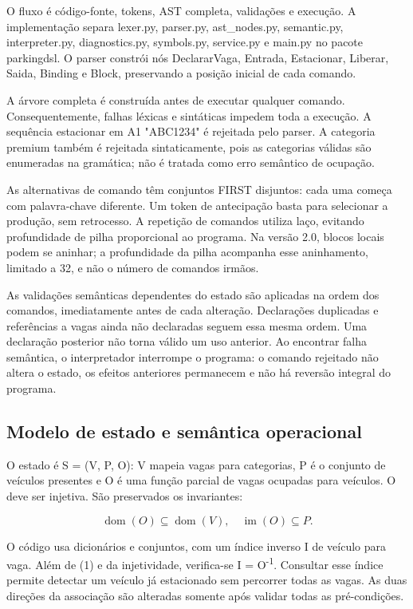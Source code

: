 \documentclass[conference,a4paper]{IEEEtran}
\begin{document}
O fluxo é código-fonte, tokens, AST completa, validações e execução. A implementação separa lexer.py, parser.py, ast\_nodes.py, semantic.py, interpreter.py, diagnostics.py, symbols.py, service.py e main.py no pacote parkingdsl. O parser constrói nós DeclararVaga, Entrada, Estacionar, Liberar, Saida, Binding e Block, preservando a posição inicial de cada comando.


A árvore completa é construída antes de executar qualquer comando. Consequentemente, falhas léxicas e sintáticas impedem toda a execução. A sequência estacionar em A1 "ABC1234" é rejeitada pelo parser. A categoria premium também é rejeitada sintaticamente, pois as categorias válidas são enumeradas na gramática; não é tratada como erro semântico de ocupação.


As alternativas de comando têm conjuntos FIRST disjuntos: cada uma começa com palavra-chave diferente. Um token de antecipação basta para selecionar a produção, sem retrocesso. A repetição de comandos utiliza laço, evitando profundidade de pilha proporcional ao programa. Na versão 2.0, blocos locais podem se aninhar; a profundidade da pilha acompanha esse aninhamento, limitado a 32, e não o número de comandos irmãos.


As validações semânticas dependentes do estado são aplicadas na ordem dos comandos, imediatamente antes de cada alteração. Declarações duplicadas e referências a vagas ainda não declaradas seguem essa mesma ordem. Uma declaração posterior não torna válido um uso anterior. Ao encontrar falha semântica, o interpretador interrompe o programa: o comando rejeitado não altera o estado, os efeitos anteriores permanecem e não há reversão integral do programa.


\subsection{Modelo de estado e semântica operacional}

O estado é S = (V, P, O): V mapeia vagas para categorias, P é o conjunto de veículos presentes e O é uma função parcial de vagas ocupadas para veículos. O deve ser injetiva. São preservados os invariantes:


\begin{equation}\operatorname{dom}(O)\subseteq\operatorname{dom}(V),\quad\operatorname{im}(O)\subseteq P.\label{eq:inv}\end{equation}

O código usa dicionários e conjuntos, com um índice inverso I de veículo para vaga. Além de (1) e da injetividade, verifica-se I = O\textsuperscript{-1}. Consultar esse índice permite detectar um veículo já estacionado sem percorrer todas as vagas. As duas direções da associação são alteradas somente após validar todas as pré-condições.
\end{document}
